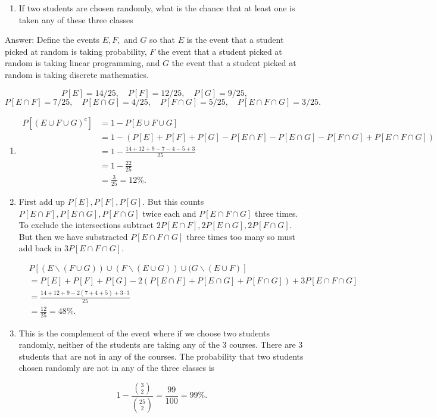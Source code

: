 \documentclass{article}
\begin{document}
\begin{enumerate}
\begin{enumerate}
\item If two students are chosen randomly, what is the chance that at least one is taken any of these three classes
\end{enumerate}

Answer: Define the events $E,F,$ and $G$ so that $E$ is the event that a student picked at random is taking probability, $F$ the event that a student picked at random is taking linear programming, and $G$ the event that a student picked at random is taking discrete mathematics.

$$
P[E] = 14/25, \quad P[F] = 12/25, \quad P[G] = 9/25,
$$
$$
P[E \cap F] = 7/25, \quad P[E\cap G] = 4/25, \quad P[F\cap G] = 5/25, \quad P[E\cap F \cap G] = 3/25.
$$ 

\begin{enumerate}
\item

\begin{align*}
P[(E\cup F \cup G)^c] &= 1 - P[E\cup F \cup G] \\
&= 1 - (P[E] + P[F] + P[G] - P[E \cap F] - P[E \cap G] - P[F \cap G] + P[E \cap F \cap G]) \\
&= 1 - \frac{14 + 12 + 9 - 7 - 4 - 5 + 3}{25} \\
&= 1 - \frac{22}{25} \\
&= \frac{3}{25} = 12\%.
\end{align*}

\item First add up $P[E], P[F], P[G]$. But this counts $P[E\cap F], P[E \cap G], P[F \cap G]$ twice each and $P[E \cap F \cap G]$ three times. To exclude the intersections subtract $2P[E\cap F], 2P[E \cap G], 2P[F \cap G]$. But then we have substracted $P[E\cap F \cap G]$ three times too many so must add back in $3P[E\cap F \cap G]$. 

\begin{align*}
&P[(E \backslash (F \cup G)) \cup (F \backslash (E \cup G)) \cup (G \backslash (E \cup F)]\\
&= P[E] + P[F] + P[G] - 2(P[E \cap F] + P[E\cap G] + P[F \cap G]) + 3P[E \cap F \cap G] \\
&= \frac{14 + 12 + 9 - 2(7 + 4 + 5) + 3\cdot 3}{25} \\
&= \frac{12}{25} = 48\%.
\end{align*}

\item This is the complement of the event where if we choose two students randomly, neither of the students are taking any of the 3 courses. There are 3 students that are not in any of the courses. The probability that two students chosen randomly are not in any of the three classes is

$$
1 - \frac{\binom{3}{2}}{\binom{25}{2}} = \frac{99}{100} = 99\%.
$$

\end{enumerate}


\end{enumerate}
\end{document}
